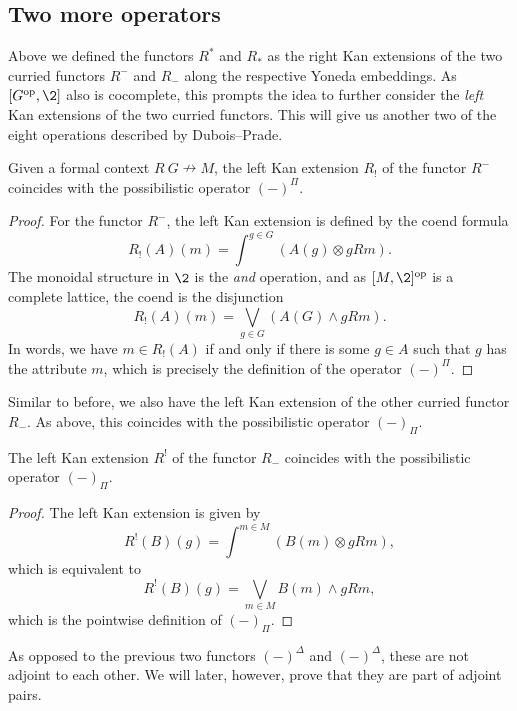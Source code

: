 \subsection{Two more operators}

Above we defined the functors $R^*$ and $R_*$ as the right Kan extensions of the two curried functors $R^-$ and $R_-$ along the respective Yoneda embeddings. As $[G\op, \2]$ also is cocomplete, this prompts the idea to further consider the \emph{left} Kan extensions of the two curried functors. This will give us another two of the eight operations described by Dubois--Prade. 

\begin{lemma}
    \label{lm:upper-Pi}
    Given a formal context $R\: G\nrightarrow M$, the left Kan extension $R_!$ of the functor $R^-$ coincides with the possibilistic operator $(-)^\Pi$.  
\end{lemma}
\begin{proof}
    For the functor $R^-$, the left Kan extension is defined by the coend formula
    \[R_!(A)(m) = \int^{g\in G}(A(g)\otimes gRm).\]
    The monoidal structure in $\2$ is the \emph{and} operation, and as $[M,\2]\op$ is a complete lattice, the coend is the disjunction
    \[R_!(A)(m) = \bigvee_{g\in G}(A(G)\wedge gRm).\]
    In words, we have $m\in R_!(A)$ if and only if there is some $g\in A$ such that $g$ has the attribute $m$, which is precisely the definition of the operator $(-)^\Pi$.
\end{proof}

Similar to before, we also have the left Kan extension of the other curried functor $R_-$. As above, this coincides with the possibilistic operator $(-)_\Pi$. 

\begin{lemma}
    \label{lm:lower-Pi}
    The left Kan extension $R^!$ of the functor $R_-$ coincides with the possibilistic operator $(-)_\Pi$. 
\end{lemma}
\begin{proof}
    The left Kan extension is given by
    \[R^!(B)(g) = \int^{m\in M}(B(m)\otimes gRm),\]
    which is equivalent to 
    \[R^!(B)(g)=\bigvee_{m\in M}B(m)\wedge gRm,\]
    which is the pointwise definition of $(-)_\Pi$. 
\end{proof}

As opposed to the previous two functors $(-)^\Delta$ and $(-)^\Delta$, these are not adjoint to each other. We will later, however, prove that they are part of adjoint pairs. 


